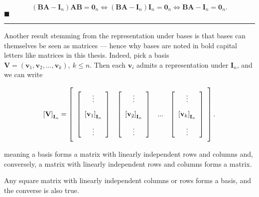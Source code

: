 \begin{equation} \left(\mathbf{BA} - \mathbf{I}_n\right)\mathbf{AB} = \mathbf{0}_n \Leftrightarrow \left(\mathbf{BA} - \mathbf{I}_n\right)\mathbf{I}_n = \mathbf{0}_n \Leftrightarrow \mathbf{BA} - \mathbf{I}_n = \mathbf{0}_n .\end{equation}
\hfill$\blacksquare$
\vspace{5mm}
\hrule
\vspace{5mm} %

	Another result stemming from the representation under bases is that bases can themselves be seen as matrices — hence why bases are noted in bold capital letters like matrices in this thesis. Indeed, pick a basis $\mathbf{V} = \left(\mathbf{v}_1,\mathbf{v}_2,...,\mathbf{v}_k\right),\ k\leq n$. Then each $\mathbf{v}_i$ admits a representation under $\mathbf{I}_n$, and we can write

\begin{equation} \left[\mathbf{V}\right]_{\mathbf{I}_n} = \left[\raisebox{15mm}{} \begin{array}{cccc} \left[\begin{array}{c} \vdots \\[3mm] \left[\mathbf{v}_1\right]_{\mathbf{I}_n} \\[3mm] \vdots \end{array}\right] & \left[\begin{array}{c} \vdots \\[3mm] \left[\mathbf{v}_2\right]_{\mathbf{I}_n} \\[3mm] \vdots \end{array}\right] & ... & \left[\begin{array}{c} \vdots \\[3mm] \left[\mathbf{v}_k\right]_{\mathbf{I}_n} \\[3mm] \vdots \end{array}\right]\end{array}\right] . \label{eq:complete_basis_bn}\end{equation}

	\noindent meaning a basis forms a matrix with linearly independent rows and columns and, conversely, a matrix with linearly independent rows and columns forms a matrix.

\begin{theorem}\label{theo:bases_as_matrices} %
	Any square matrix with linearly independent columns or rows forms a basis, and the converse is also true.
\end{theorem}

